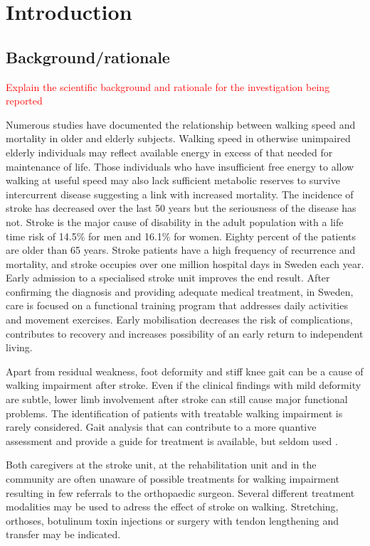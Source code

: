 \documentclass[a4paper,12pt]{article}
\begin{document}
\section{Introduction}
\subsection{Background/rationale} \textcolor{red}{Explain the scientific background and rationale for the investigation being reported} 

Numerous studies have documented the relationship between walking speed and mortality in older and elderly subjects\cite{Dumurgier2009,Stanaway2011,Elbaz2013}. Walking speed in otherwise unimpaired elderly individuals may reflect available energy in excess of that needed for maintenance of life\cite{Schrack2010}. Those individuals who have insufficient free energy to allow walking at useful speed may also lack sufficient metabolic reserves to survive intercurrent disease suggesting a link with increased mortality. 
The incidence of stroke has decreased over the last 50 years but the seriousness of the disease has not. Stroke is the major cause of disability in the adult population with a life time risk of 14.5\% for men and 16.1\% for women\cite{Carandang2006}. Eighty percent of the patients are older than 65 years. Stroke patients have a high frequency of recurrence and mortality, and stroke occupies over one million hospital days in Sweden each year. Early admission to a specialised stroke unit improves the end result. After confirming the diagnosis and providing adequate medical treatment, in Sweden, care is focused on a functional training program that addresses daily activities and movement exercises. Early mobilisation decreases the risk of complications, contributes to recovery and increases possibility of an early return to independent living\cite {Indredavik1998,Joergensen1999d}.

Apart from residual weakness, foot deformity and stiff knee gait can be a cause of walking impairment after stroke. Even if the clinical findings with mild deformity are subtle, lower limb involvement after stroke can still cause major functional problems. The identification of patients with treatable walking impairment is rarely considered. Gait analysis that can contribute to a more quantive assessment and provide a guide for treatment is available, but seldom used \cite{Cooper1999j,Fuller2002,Patrick2007}. 

Both caregivers at the stroke unit, at the rehabilitation unit and in the community are often unaware of possible treatments for walking impairment  resulting in few referrals to the orthopaedic surgeon. Several different treatment modalities may be used to adress the effect of stroke on walking. Stretching, orthoses, botulinum toxin injections or surgery with tendon lengthening and transfer may be indicated\cite{Cooper1999j,Leroux2005a,Morita1998e,Pinzur1986,Reddy2008,Stoquart2008,Bayram2006a}.
\end{document}
